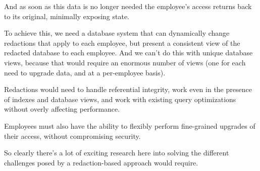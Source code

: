 And as soon as this data is no longer needed the employee’s access returns back
to its original, minimally exposing state.

To achieve this, we need a database system that can dynamically change
redactions that apply to each employee, but present a consistent view of the
redacted database to each employee.  And we can’t do this with unique database
views, because that would require an enormous number of views (one for each need
to upgrade data, and at a per-employee basis).

Redactions would need to handle referential integrity, work even in the presence
of indexes and database views, and work with existing query optimizations
without overly affecting performance.

Employees must also have the ability to flexibly perform fine-grained upgrades
of their access, without compromising security.

So clearly there’s a lot of exciting research here into solving the different
challenges posed by a redaction-based approach would require.


